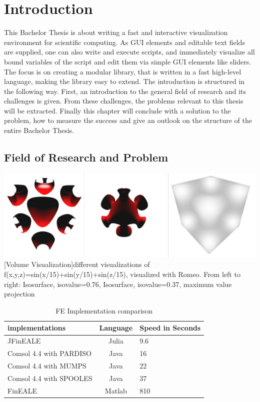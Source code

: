 \section{Introduction}
This Bachelor Thesis is about writing a fast and interactive visualization environment for scientific computing. 
As GUI elements and editable text fields are supplied, one can also write and execute scripts, and immediately visualize all bound variables of the script and edit them via simple GUI elements like sliders. The focus is on creating a modular library, that is written in a fast high-level language, making the library easy to extend.
The introduction is structured in the following way.
First, an introduction to the general field of research and its challenges is given. 
From these challenges, the problems relevant to this thesis will be extracted.
Finally this chapter will conclude with a solution to the problem, how to measure the success and give an outlook on the structure of the entire Bachelor Thesis.
 
\subsection{Field of Research and Problem}

\vspace{1em}
\begin{minipage}{\linewidth}
    \centering
    \includegraphics[width=0.7\linewidth]{Bilder/surfaces.png}
    [Volume Visualization]{different visualizations of f(x,y,z)=sin(x/15)+sin(y/15)+sin(z/15), visualized with Romeo. From left to right: Isosurface, isovalue=0.76, Isosurface, isovalue=0.37, maximum value projection}
    \label{fig:volume}
\end{minipage}


\begin{table}[htb]
\centering
\caption{FE Implementation comparison}
   	\sffamily 
   	\begin{tabularx}{1.0\textwidth}{l | c | p{5cm}}
		\hline
    	implementations			& Language  & Speed in Seconds \\
    	\hline
	    JFinEALE                & Julia     & 9.6	\\
		Comsol 4.4 with PARDISO & Java      & 16	\\
		Comsol 4.4 with MUMPS   & Java      & 22	\\ 
		Comsol 4.4 with SPOOLES & Java      & 37	\\ 
		FinEALE                 & Matlab    & 810 	\\
		\hline
    \end{tabularx} 
    \normalfont
	\label{table:Emissivity}
\end{table}


